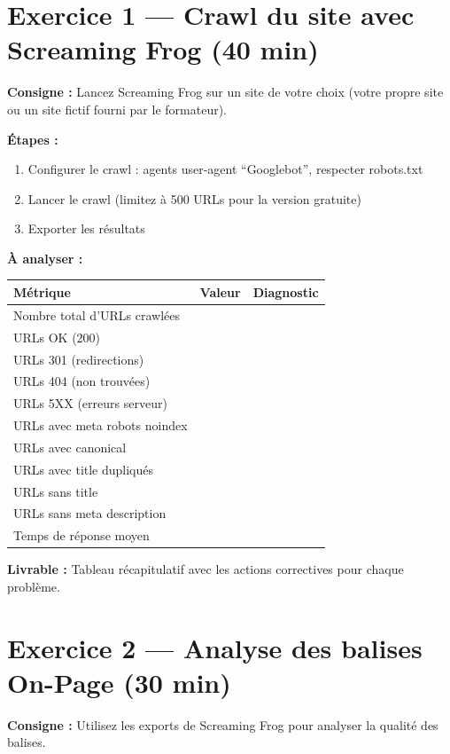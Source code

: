 \documentclass[12pt,a4paper]{report}
\begin{document}
\section{Exercice 1 --- Crawl du site avec Screaming Frog (40 min)}

\textbf{Consigne :} Lancez Screaming Frog sur un site de votre choix (votre propre site ou un site fictif fourni par le formateur).

\textbf{Étapes :}
\begin{enumerate}
\item Configurer le crawl : agents user-agent ``Googlebot'', respecter robots.txt
\item Lancer le crawl (limitez à 500 URLs pour la version gratuite)
\item Exporter les résultats
\end{enumerate}

\textbf{À analyser :}

\begin{tabular}{|l|c|l|}
\hline
\textbf{Métrique} & \textbf{Valeur} & \textbf{Diagnostic} \\
\hline
Nombre total d'URLs crawlées & & \\
\hline
URLs OK (200) & & \\
\hline
URLs 301 (redirections) & & \\
\hline
URLs 404 (non trouvées) & & \\
\hline
URLs 5XX (erreurs serveur) & & \\
\hline
URLs avec meta robots noindex & & \\
\hline
URLs avec canonical & & \\
\hline
URLs avec title dupliqués & & \\
\hline
URLs sans title & & \\
\hline
URLs sans meta description & & \\
\hline
Temps de réponse moyen & & \\
\hline
\end{tabular}

\textbf{Livrable :} Tableau récapitulatif avec les actions correctives pour chaque problème.

\section{Exercice 2 --- Analyse des balises On-Page (30 min)}

\textbf{Consigne :} Utilisez les exports de Screaming Frog pour analyser la qualité des balises.
\end{document}
